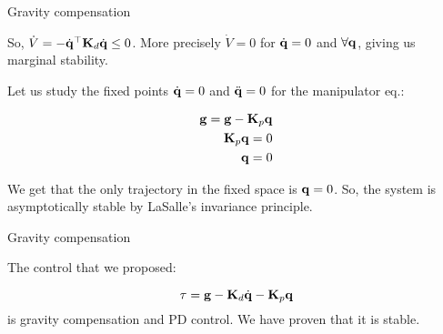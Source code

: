 \documentclass{beamer}
\begin{document}
\begin{frame}{Gravity compensation}
	\begin{flushleft}
		
		So, $\dot V = 
		-\dot{\mathbf{q}}^\top  \mathbf{K}_d \dot{\mathbf{q}} \leq 0$. More precisely $\dot V = 0$ for $\dot{\mathbf{q}} = 0$ and $\forall \mathbf{q}$, giving us marginal stability.
		
		\bigskip
		
		Let us study the fixed points $\dot{\mathbf{q}} = 0$ and $\ddot{\mathbf{q}} = 0$ for the manipulator eq.:
		
		\begin{align}
			\mathbf{g} = \mathbf{g}  - \mathbf{K}_p \mathbf{q} \\
			\mathbf{K}_p \mathbf{q} = 0 \\
			\mathbf{q} = 0
		\end{align}				
	
		We get that the only trajectory in the fixed space is $\mathbf{q} = 0$. So, the system is asymptotically stable by LaSalle's invariance principle.	
		
	\end{flushleft}
\end{frame}




\begin{frame}{Gravity compensation}
	\begin{flushleft}
		
		The control that we proposed:
		
		\begin{equation}
			\tau = \mathbf{g}  - \mathbf{K}_d \dot{\mathbf{q}}  - \mathbf{K}_p \mathbf{q}
		\end{equation}		
	is gravity compensation and PD control. We have proven that it is  stable.
		
	\end{flushleft}
\end{frame}
\end{document}
